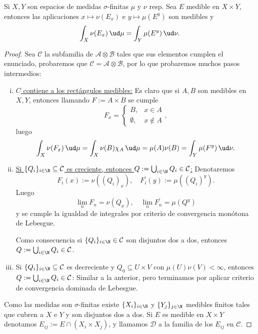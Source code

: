 \begin{thm}
	Si $X,Y$ son espacios de medidas $\sigma$-finitas $\mu$ y $\nu$ resp.
	Sea $E$ medible en $X\times Y$, entonces las aplicaciones $x\mapsto\nu(E_x)$ e $y\mapsto\mu(E^y)$ son medibles y
	$$ \int_X \nu(E_x)\,\ud\mu = \int_Y \mu(E^y)\,\ud\nu. $$
\end{thm}
\begin{proof}
	Sea $\mathcal{C}$ la subfamilia de $\mathcal{A\otimes B}$ tales que sus elementos cumplen el enunciado,
	probaremos que $\mathcal{C = A\otimes B}$, por lo que probaremos muchos pasos intermedios:
	\begin{enumerate}[i)]
		\item \underline{$C$ contiene a los rectángulos medibles:}
			Es claro que si $A,B$ son medibles en $X,Y$, entonces llamando $F := A\times B$ se cumple
			$$ F_x =
			\begin{cases}
				B, &x\in A\\
				\emptyset, &x\notin A
			\end{cases}, $$
			luego
			$$ \int_X \nu(F_x)\,\ud\mu = \int_X \nu(B)\chi_A\,\ud\mu = \mu(A)\nu(B) = \int_Y \mu(F^y)\,\ud\nu. $$

		\item \underline{Si $\{Q_i\}_{i\in\N} \subseteq \mathcal{C}$ es creciente, entonces $Q := \bigcup_{i\in\N}Q_i \in \mathcal{C}$:}
			Denotaremos
			$$ F_i(x) := \nu((Q_i)_x),\quad F^\prime_i(y) := \mu((Q_i)^y). $$
			Luego
			$$ \lim_n F_n = \nu(Q_x),\quad\lim_n F_n^\prime = \mu(Q^y) $$
			y se cumple la igualdad de integrales por criterio de convergencia monótona de Lebesgue.
			\par
			Como consecuencia si $\{Q_i\}_{i\in\N} \in \mathcal{C}$ son disjuntos dos a dos, entonces $Q:=\bigcup_{i\in\N}Q_i \in \mathcal{C}$.

		\item Si $\{Q_i\}_{i\in\N} \subseteq \mathcal{C}$ es decreciente y $Q_0\subseteq U\times V$ con $\mu(U)\nu(V) < \infty$,
			entonces $Q:=\bigcup_{i\in\N}Q_i \in \mathcal{C}$:
			Similar a la anterior, pero terminamos por aplicar criterio de convergencia dominada de Lebesgue.
	\end{enumerate}
	Como las medidas son $\sigma$-finitas existe $\{X_i\}_{i\in\N}$ y $\{Y_j\}_{j\in\N}$ medibles finitos tales que cubren a $X$ e $Y$ y son disjuntos dos a dos.
	Si $E$ es medible en $X\times Y$ denotamos $E_{ij} := E\cap(X_i\times X_j)$, y llamamos $\mathcal{D}$ a la familia de los $E_{ij}$ en $\mathcal{C}$.
\end{proof}

